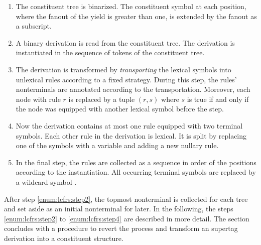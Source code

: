 \documentclass[../../document.tex]{subfiles}
\begin{document}
    \begin{enumerate}
        \item\label{enum:lcfrs:step1}
            The constituent tree is binarized.
            The constituent symbol at each position, where the fanout of the yield is greater than one, is extended by the fanout as a subscript.
        \item\label{enum:lcfrs:step2}
            A binary  derivation is read from the constituent tree.
            The derivation is instantiated in the sequence of tokens of the constituent tree.
        \item\label{enum:lcfrs:step3}
            The derivation is transformed by \emph{transporting} the lexical symbols into unlexical rules according to a fixed strategy.
            During this step, the rules' nonterminals are annotated according to the transportation.
            Moreover, each node with rule \(r\) is replaced by a tuple \((r, s)\) where \(s\) is true if and only if the node was equipped with another lexical symbol before the step.
        \item\label{enum:lcfrs:step4}
            Now the derivation contains at most one rule equipped with two terminal symbols. Each other rule in the derivation is lexical.
            It is split by replacing one of the symbols with a variable and adding a new nullary rule.
        \item
            In the final step, the rules are collected as a sequence in order of the positions according to the instantiation.
            All occurring terminal symbols are replaced by a wildcard symbol \tn{*}.
    \end{enumerate}
    After step \ref{enum:lcfrs:step2}, the topmost  nonterminal is collected for each tree and set aside as an initial nonterminal for later.
    In the following, the steps \ref{enum:lcfrs:step2} to \ref{enum:lcfrs:step4} are described in more detail.
    The section concludes with a procedure to revert the process and transform an  supertag derivation into a constituent structure.
\end{document}
